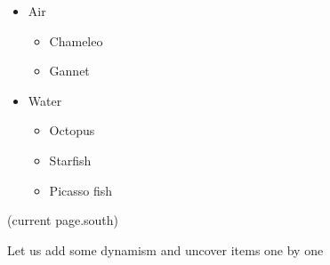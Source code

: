 
\begin{itemize}
\item
Air
\begin{itemize}
\item
Chameleo
\item
Gannet
\end{itemize}
\item
Water
\begin{itemize}
\item
Octopus
\item
Starfish
\item
Picasso fish
\end{itemize}
\end{itemize}
(current page.south){\bfseries
\begin{minipage}{0.5\textwidth}
Let us add some dynamism and uncover items one by one
\end{minipage}%
}%
